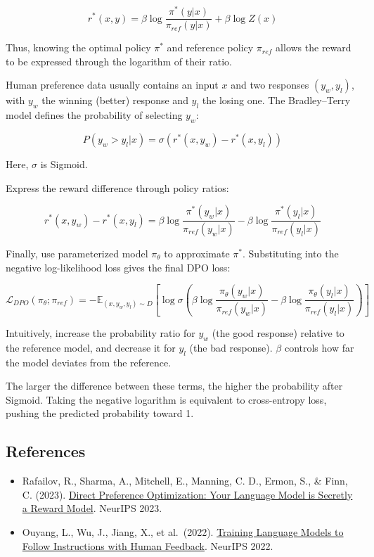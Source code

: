 \[
r^*(x,y)=\beta\log\frac{\pi^*(y|x)}{\pi_{ref}(y|x)}+\beta\log Z(x)
\]

Thus, knowing the optimal policy \(\pi^*\) and reference policy \(\pi_{ref}\) allows the reward to be expressed through the logarithm of their ratio.

Human preference data usually contains an input \(x\) and two responses \((y_w,y_l)\), with \(y_w\) the winning (better) response and \(y_l\) the losing one. The Bradley--Terry model defines the probability of selecting \(y_w\):

\[
P(y_w>y_l|x)=\sigma(r^*(x,y_w)-r^*(x,y_l))
\]

Here, \(\sigma\) is Sigmoid.

Express the reward difference through policy ratios:

\[
r^*(x,y_w)-r^*(x,y_l)=\beta\log\frac{\pi^*(y_w|x)}{\pi_{ref}(y_w|x)}-\beta\log\frac{\pi^*(y_l|x)}{\pi_{ref}(y_l|x)}
\]

Finally, use parameterized model \(\pi_\theta\) to approximate \(\pi^*\). Substituting into the negative log-likelihood loss gives the final DPO loss:

\[
\mathcal{L}_{DPO}(\pi_\theta;\pi_{ref})=-\mathbb{E}_{(x,y_w,y_l)\sim D}\left[\log\sigma\left(\beta\log\frac{\pi_\theta(y_w|x)}{\pi_{ref}(y_w|x)}-\beta\log\frac{\pi_\theta(y_l|x)}{\pi_{ref}(y_l|x)}\right)\right]
\]

Intuitively, increase the probability ratio for \(y_w\) (the good response) relative to the reference model, and decrease it for \(y_l\) (the bad response). \(\beta\) controls how far the model deviates from the reference.

The larger the difference between these terms, the higher the probability after Sigmoid. Taking the negative logarithm is equivalent to cross-entropy loss, pushing the predicted probability toward 1.

\FloatBarrier
{}
\hypertarget{references-80}{%
\subsection{References}\label{references-80}}

\vspace{0.25em}
\begin{itemize}
\tightlist
\item
  Rafailov, R., Sharma, A., Mitchell, E., Manning, C. D., Ermon, S., \& Finn, C. (2023). \href{https://arxiv.org/abs/2305.18290}{Direct Preference Optimization: Your Language Model is Secretly a Reward Model}. NeurIPS 2023.
\item
  Ouyang, L., Wu, J., Jiang, X., et al.~(2022). \href{https://arxiv.org/abs/2203.02155}{Training Language Models to Follow Instructions with Human Feedback}. NeurIPS 2022.
\end{itemize}

\clearpage

